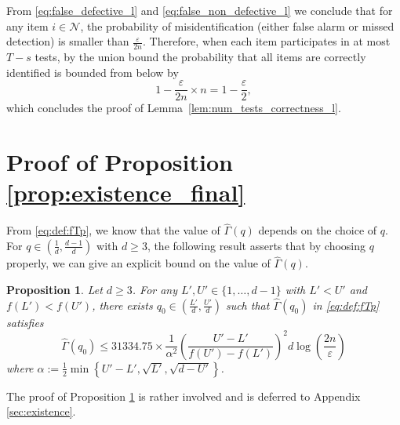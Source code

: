 \documentclass[onecolumn,letterpaper]{IEEEtran}
\newtheorem{proposition}{Proposition}
\newcommand{\cp}{{q}}
\newcommand{\mo}{{s}}
\newcommand{\up}{{U}}
\newcommand{\lw}{{L}}
\newcommand{\ap}{{\alpha}}
\newcommand{\ftaup}{{\hat{\Gamma}}}
\newcommand{\fTp}{\ftaup (\cp)}
\newcommand{\cpns}{\cp_0}
\newcommand{\fTpns}{\ftaup (\cpns)}
\begin{document}
From \eqref{eq:false_defective_l} and \eqref{eq:false_non_defective_l} we conclude that for any item $i\in \mathcal{N}$, the probability of misidentification (either false alarm or missed detection) is smaller than $\frac{\varepsilon}{2n}$. Therefore, when each item participates in at most $T-\mo$ tests, by the union bound the probability that all items are correctly identified is bounded from below by
\begin{equation}
    1 - \frac{\varepsilon}{2n} \times n = 1 - \frac{\varepsilon}{2},
\end{equation}
which concludes the proof of Lemma~\ref{lem:num_tests_correctness_l}.



\section{Proof of Proposition \ref{prop:existence_final}}
\label{sec:existence_final}
From \eqref{eq:def:fTp}, we know that the value of $\fTp$ depends on the choice of $\cp$. %
For $\cp\in \left(\frac 1 d , \frac {d-1}{d}\right)$ with $d\geq 3$, the following result asserts that by choosing $\cp$ properly, we can give an explicit bound on the value of $\fTp$.



\begin{proposition} 
\label{prop:existence}
Let $d\geq 3$. For any $\lw',\up' \in \{1 ,\dots, d-1\}$ with $\lw' < \up'$ and $f(\lw')<f(\up')$, there exists $\cpns \in \left(\frac {\lw'} {d}, \frac {\up'} {d}\right)$ such that $\fTpns$ in \eqref{eq:def:fTp} satisfies
\begin{equation}
\label{eq:existence_interval_d}
\fTpns \leq  31334.75 \times \frac{1}{\ap^2} \left( \frac{\up'-\lw'}{f(\up')-f(\lw')} \right)^2  d\log \left( \frac{2n}{\varepsilon } \right)
\end{equation} 
where $\ap := \frac{1}{2} \min\left\{\up'-\lw',\sqrt{\lw'},\sqrt{d-\up'}\right\}$.
\end{proposition}
\begin{IEEEproof}
The proof of Proposition \ref{prop:existence} is rather involved and is 
deferred to Appendix \ref{sec:existence}.
\end{IEEEproof}
\end{document}
